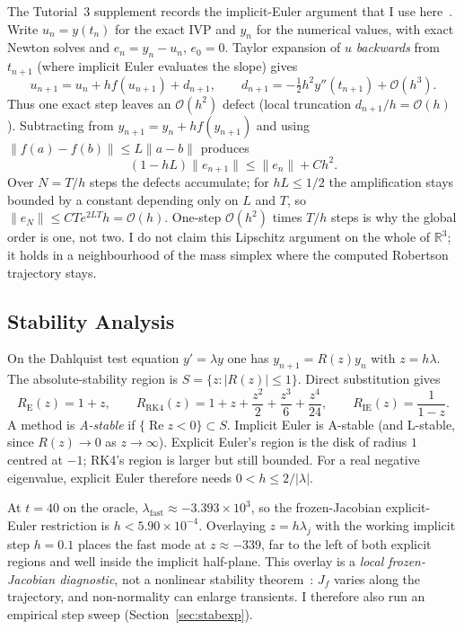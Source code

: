 \documentclass[11pt,a4paper]{article}
\begin{document}
The Tutorial~3 supplement records the implicit-Euler argument that I use here~\cite{tutorial3supp}. Write \(u_n=y(t_n)\) for the exact IVP and \(y_n\) for the numerical values, with exact Newton solves and \(e_n=y_n-u_n\), \(e_0=0\). Taylor expansion of \(u\) \emph{backwards} from \(t_{n+1}\) (where implicit Euler evaluates the slope) gives
\begin{equation}
u_{n+1}=u_n+h f(u_{n+1})+d_{n+1},\qquad
d_{n+1}=-\tfrac12 h^2 y''(t_{n+1})+\mathcal{O}(h^3).
\end{equation}
Thus one exact step leaves an \(\mathcal{O}(h^2)\) defect (local truncation \(d_{n+1}/h=\mathcal{O}(h)\)). Subtracting from \(y_{n+1}=y_n+hf(y_{n+1})\) and using \(\|f(a)-f(b)\|\le L\|a-b\|\) produces
\begin{equation}
(1-hL)\|e_{n+1}\|\le \|e_n\|+Ch^2.
\end{equation}
Over \(N=T/h\) steps the defects accumulate; for \(hL\le 1/2\) the amplification stays bounded by a constant depending only on \(L\) and \(T\), so \(\|e_N\|\le CTe^{2LT}h=\mathcal{O}(h)\). One-step \(\mathcal{O}(h^2)\) times \(T/h\) steps is why the global order is one, not two. I do not claim this Lipschitz argument on the whole of \(\mathbb{R}^3\); it holds in a neighbourhood of the mass simplex where the computed Robertson trajectory stays.

\subsection{Stability Analysis}
\label{sec:stab}
On the Dahlquist test equation \(y'=\lambda y\) one has \(y_{n+1}=R(z)y_n\) with \(z=h\lambda\). The absolute-stability region is \(S=\{z:|R(z)|\le 1\}\). Direct substitution gives
\begin{equation}
R_{\mathrm{E}}(z)=1+z,\qquad
R_{\mathrm{RK4}}(z)=1+z+\frac{z^2}{2}+\frac{z^3}{6}+\frac{z^4}{24},\qquad
R_{\mathrm{IE}}(z)=\frac{1}{1-z}.
\label{eq:R}
\end{equation}
A method is \emph{A-stable} if \(\{\operatorname{Re}z<0\}\subset S\). Implicit Euler is A-stable (and L-stable, since \(R(z)\to 0\) as \(z\to\infty\)). Explicit Euler's region is the disk of radius \(1\) centred at \(-1\); RK4's region is larger but still bounded. For a real negative eigenvalue, explicit Euler therefore needs \(0<h\le 2/|\lambda|\).

At \(t=40\) on the oracle, \(\lambda_{\mathrm{fast}}\approx -3.393\times 10^3\), so the frozen-Jacobian explicit-Euler restriction is \(h<5.90\times 10^{-4}\). Overlaying \(z=h\lambda_j\) with the working implicit step \(h=0.1\) places the fast mode at \(z\approx -339\), far to the left of both explicit regions and well inside the implicit half-plane. This overlay is a \emph{local frozen-Jacobian diagnostic}, not a nonlinear stability theorem~\cite{hairer1996}: \(J_f\) varies along the trajectory, and non-normality can enlarge transients. I therefore also run an empirical step sweep (Section~\ref{sec:stabexp}).
\end{document}
